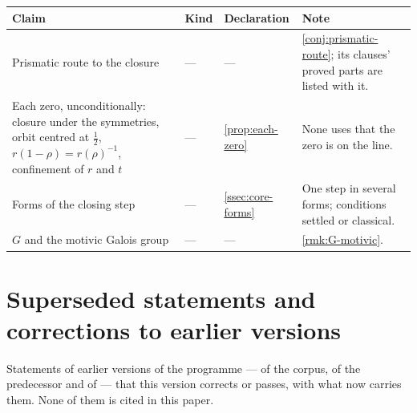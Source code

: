 {\scriptsize\setlength{\tabcolsep}{3pt}
\begin{longtable}{>{\raggedright\arraybackslash}p{}>{\raggedright\arraybackslash}p{}>{\raggedright\arraybackslash}p{}>{\raggedright\arraybackslash}p{}}
\toprule Claim & Kind & Declaration & Note\\\midrule\endhead
Prismatic route to the closure & — & --- & \cref{conj:prismatic-route}; its clauses' proved parts are listed with it.\\
Each zero, unconditionally: closure under the symmetries, orbit centred at $\tfrac12$, $r(1-\rho)=r(\rho)^{-1}$, confinement of $r$ and $t$ & — & \cref{prop:each-zero} & None uses that the zero is on the line.\\
Forms of the closing step & — & \cref{ssec:core-forms} & One step in several forms; conditions settled or classical.\\
$G$ and the motivic Galois group & — & --- & \cref{rmk:G-motivic}.\\
\bottomrule\end{longtable}}

\section{Superseded statements and corrections to earlier versions}\label{app:superseded}\label{app:corrections}

Statements of earlier versions of the programme --- of the corpus, of the predecessor
\cite{gonzalez26oddzeta} and of \cite{gonzalez25hp} --- that this version corrects or
passes, with what now carries them.  None of them is cited in this paper.

